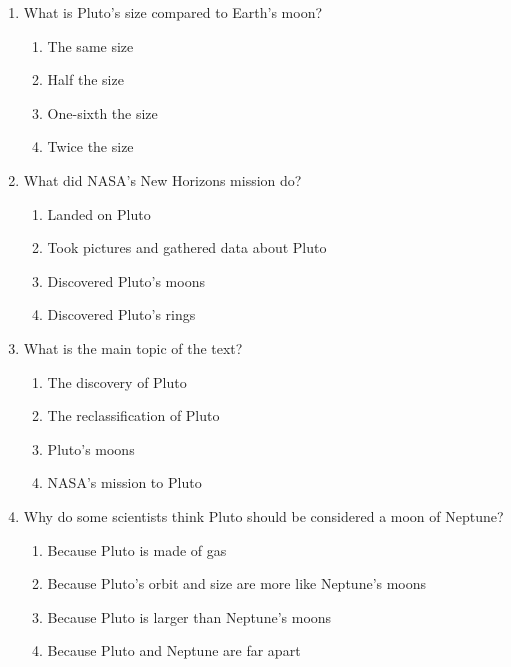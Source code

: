 \documentclass[12pt]{article}
\begin{document}
\begin{enumerate}
    \vspace{0.5cm}

    \item What is Pluto's size compared to Earth’s moon?

    \begin{enumerate}[label=\Alph*.]
        \item The same size
        \item Half the size
        \item One-sixth the size
        \item Twice the size
    \end{enumerate}
    
    \vspace{0.5cm}

    \item What did NASA's New Horizons mission do?

    \begin{enumerate}[label=\Alph*.]
        \item Landed on Pluto
        \item Took pictures and gathered data about Pluto
        \item Discovered Pluto’s moons
        \item Discovered Pluto’s rings
    \end{enumerate}
    
    \vspace{0.5cm}

    \item What is the main topic of the text?

    \begin{enumerate}[label=\Alph*.]
        \item The discovery of Pluto
        \item The reclassification of Pluto
        \item Pluto’s moons
        \item NASA’s mission to Pluto
    \end{enumerate}
    
    \vspace{0.5cm}

    \item Why do some scientists think Pluto should be considered a moon of Neptune?

    \begin{enumerate}[label=\Alph*.]
        \item Because Pluto is made of gas
        \item Because Pluto’s orbit and size are more like Neptune’s moons
        \item Because Pluto is larger than Neptune’s moons
        \item Because Pluto and Neptune are far apart
    \end{enumerate}
    

\end{enumerate}
\end{document}

